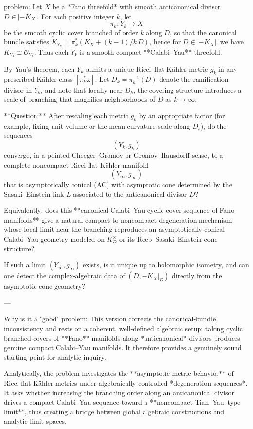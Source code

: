 problem:  
Let \( X \) be a *Fano threefold* with smooth anticanonical divisor \( D \in |-K_X| \).  
For each positive integer \( k \), let  
\[
\pi_k : Y_k \to X
\]  
be the smooth cyclic cover branched of order \( k \) along \( D \), so that the canonical bundle satisfies \( K_{Y_k} = \pi_k^*(K_X + (k-1)/k \, D) \), hence for \( D \in |-K_X| \), we have \( K_{Y_k} \cong \mathcal{O}_{Y_k} \). Thus each \(Y_k\) is a smooth compact **Calabi–Yau** threefold.  

By Yau’s theorem, each \(Y_k\) admits a unique Ricci–flat Kähler metric \( g_k \) in any prescribed Kähler class \( [\pi_k^*\omega] \).  
Let \( D_k = \pi_k^{-1}(D) \) denote the ramification divisor in \( Y_k \), and note that locally near \( D_k \), the covering structure introduces a scale of branching that magnifies neighborhoods of \(D\) as \(k \to \infty\).

**Question:**  
After rescaling each metric \(g_k\) by an appropriate factor (for example, fixing unit volume or the mean curvature scale along \( D_k \)), do the sequences  
\[
(Y_k, g_k)
\]
converge, in a pointed Cheeger–Gromov or Gromov–Hausdorff sense, to a complete noncompact Ricci‑flat Kähler manifold  
\[
(Y_\infty, g_\infty)
\]
that is asymptotically conical (AC) with asymptotic cone determined by the Sasaki–Einstein link \( L \) associated to the anticanonical divisor \( D \)?  

Equivalently: does this **canonical Calabi–Yau cyclic‑cover sequence of Fano manifolds** give a natural compact‑to‑noncompact degeneration mechanism whose local limit near the branching reproduces an asymptotically conical Calabi–Yau geometry modeled on \( K_D^\times \) or its Reeb–Sasaki–Einstein cone structure?

If such a limit \( (Y_\infty, g_\infty) \) exists, is it unique up to holomorphic isometry, and can one detect the complex‑algebraic data of \( (D, -K_X|_D) \) directly from the asymptotic cone geometry?

---

Why is it a "good" problem:  
This version corrects the canonical‑bundle inconsistency and rests on a coherent, well‑defined algebraic setup: taking cyclic branched covers of **Fano** manifolds along *anticanonical* divisors produces genuine compact Calabi–Yau manifolds. It therefore provides a genuinely sound starting point for analytic inquiry.

Analytically, the problem investigates the **asymptotic metric behavior** of Ricci‑flat Kähler metrics under algebraically controlled *degeneration sequences*. It asks whether increasing the branching order along an anticanonical divisor drives a compact Calabi–Yau sequence toward a **noncompact Tian–Yau–type limit**, thus creating a bridge between global algebraic constructions and analytic limit spaces.

